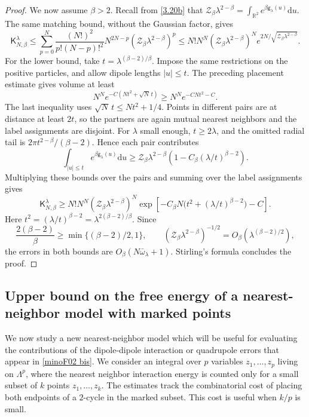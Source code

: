 \documentclass[a4paper,10pt,leqno]{amsart}
\numberwithin{equation}{section}
\newcommand{\R}{\mathbb{R}}
\newcommand{\dd}{\mathrm{d}}
\def\mc{\mathcal}
\def\g{\mathsf{g}}
\def\K{\mathsf{K}}
\begin{document}
\begin{proof}
  We now assume $\beta>2$. Recall from \eqref{3.20b} that $\mc Z_\beta\lambda^{2-\beta}=\int_{\R^2}e^{\beta\g_\lambda(u)}\dd u$. The same matching bound, without the Gaussian factor, gives
  \[
    \K_{N,\beta}^\lambda
    \le\sum_{p=0}^N\frac{(N!)^2}{p!(N-p)!^2}N^{2N-p}(\mc Z_\beta\lambda^{2-\beta})^p
    \le N!N^N(\mc Z_\beta\lambda^{2-\beta})^N e^{2N/\sqrt{\mc Z_\beta\lambda^{2-\beta}}}.
  \]
  For the lower bound, take $t=\lambda^{(\beta-2)/\beta}$. Impose the same restrictions on the positive particles, and allow dipole lengths $|u|\le t$. The preceding placement estimate gives volume at least
  \[
    N^N e^{-C(Nt^2+\sqrt N\,t)}\ge N^N e^{-CNt^2-C}.
  \]
  The last inequality uses $\sqrt N\,t\le Nt^2+1/4$. Points in different pairs are at distance at least $2t$, so the partners are again mutual nearest neighbors and the label assignments are disjoint. For $\lambda$ small enough, $t\ge2\lambda$, and the omitted radial tail is $2\pi t^{2-\beta}/(\beta-2)$. Hence each pair contributes
  \[
    \int_{|u|\le t}e^{\beta\g_\lambda(u)}\dd u
    \ge \mc Z_\beta\lambda^{2-\beta}\left(1-C_\beta(\lambda/t)^{\beta-2}\right).
  \]
  Multiplying these bounds over the pairs and summing over the label assignments gives
  \[
    \K_{N,\beta}^\lambda\ge N!N^N(\mc Z_\beta\lambda^{2-\beta})^N
    \exp\left[-C_\beta N\bigl(t^2+(\lambda/t)^{\beta-2}\bigr)-C\right].
  \]
  Here $t^2=(\lambda/t)^{\beta-2}=\lambda^{2(\beta-2)/\beta}$. Since
  \[
    \frac{2(\beta-2)}{\beta}\ge\min\{(\beta-2)/2,1\},
    \qquad (\mc Z_\beta\lambda^{2-\beta})^{-1/2}=O_\beta(\lambda^{(\beta-2)/2}),
  \]
  the errors in both bounds are $O_\beta(N\bar\omega_\lambda+1)$. Stirling's formula concludes the proof.
\end{proof}

\subsection{Upper bound on the free energy of a nearest-neighbor model with marked points}
We now study a new nearest-neighbor model which will be useful for evaluating the contributions of the dipole-dipole interaction or quadrupole errors that appear in \eqref{minoF02 bis}. We consider an integral over $p$ variables $z_1,\ldots,z_p$ living on $\Lambda^{p}$, where the nearest neighbor interaction energy is counted only for a small subset of $k$ points $z_1,\ldots,z_k$.
The estimates track the combinatorial cost of placing both endpoints of a $2$-cycle in the marked subset. This cost is useful when $k/p$ is small.
\end{document}

